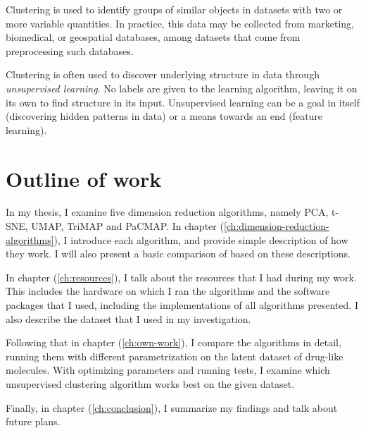 Clustering is used to identify groups of similar objects in datasets with two or more variable quantities. In practice, this data may be collected from marketing, biomedical, or geospatial databases, among datasets that come from preprocessing such databases.

Clustering is often used to discover underlying structure in data through \textit{unsupervised learning}. No labels are given to the learning algorithm, leaving it on its own to find structure in its input. Unsupervised learning can be a goal in itself (discovering hidden patterns in data) or a means towards an end (feature learning).

\section{Outline of work}


In my thesis, I examine five dimension reduction algorithms, namely PCA, t-SNE, UMAP, TriMAP and PaCMAP. In chapter (\ref{ch:dimension-reduction-algorithms}), I introduce each algorithm, and provide simple description of how they work. I will also present a basic comparison of based on these descriptions. 

In chapter (\ref{ch:resources}), I talk about the resources that I had during my work. This includes the hardware on which I ran the algorithms and the software packages that I used, including the implementations of all algorithms presented. I also describe the dataset that I used in my investigation.

Following that in chapter (\ref{ch:own-work}), I compare the algorithms in detail, running them with different parametrization on the latent dataset of drug-like molecules. With optimizing parameters and running tests, I examine which unsupervised clustering algorithm works best on the given dataset.

Finally, in chapter (\ref{ch:conclusion}), I summarize my findings and talk about future plans.